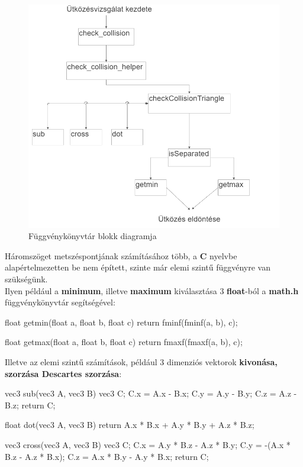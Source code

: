 
\begin{figure}[h]
	\centering
	\includegraphics[width=15truecm, height=15truecm]{images/blokk_diagram.png}
	\caption{Függvénykönyvtár blokk diagramja}
	\label{fig:blokkdiagram}
\end{figure}


\newpage
{}

Háromszöget metszéspontjának számításához több, a \textbf{C} nyelvbe alapértelmezetten be nem épített, szinte már elemi szintű függvényre van szükségünk. \\
Ilyen például a \textbf{minimum}, illetve \textbf{maximum} kiválasztása 3 \textbf{float}-ból a \textbf{math.h} függvénykönyvtár segítségével:

\begin{cpp}
float getmin(float a, float b, float c)
{
    return fminf(fminf(a, b), c);
}

float getmax(float a, float b, float c)
{
    return fmaxf(fmaxf(a, b), c);
}
\end{cpp}

Illetve az elemi szintű számítások, például 3 dimenziós vektorok \textbf{kivonása, szorzása Descartes szorzása}:

\begin{cpp}
vec3 sub(vec3 A, vec3 B)
{
    vec3 C;
    C.x = A.x - B.x;
    C.y = A.y - B.y;
    C.z = A.z - B.z;
    return C;
}
	
float dot(vec3 A, vec3 B)
{
    return A.x * B.x + A.y * B.y + A.z * B.z;
}
\end{cpp}
\newpage
\begin{cpp}
vec3 cross(vec3 A, vec3 B)
{
    vec3 C;
    C.x = A.y * B.z - A.z * B.y;
    C.y = -(A.x * B.z - A.z * B.x);
    C.z = A.x * B.y - A.y * B.x;
    return C;
}
\end{cpp}

